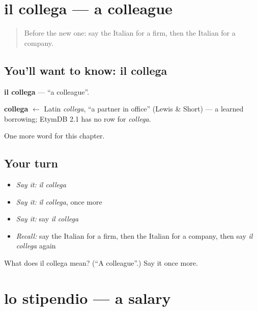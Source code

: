 \section[il collega]{il collega — a colleague}

\label{lesson:IT-C172-collega}



\begin{quote}
Before the new one: say the Italian for a firm, then the Italian for a company.
\end{quote}

\subsection*{You'll want to know: il collega}
\textbf{il collega} — \textquotedblleft{}a colleague\textquotedblright{}.

\begin{cousinweb}
\textbf{collega} $\leftarrow$ Latin \emph{collega}, \textquotedblleft{}a partner in office\textquotedblright{} (Lewis \& Short) — a learned borrowing; EtymDB 2.1 has no row for \emph{collega}.
\end{cousinweb}

\begin{grammarlens}[title={What you've built}]
One more word for this chapter.
\end{grammarlens}

\subsection*{Your turn}
\begin{itemize}
\raggedright
  \item \emph{Say it:} \emph{il collega}
  \item \emph{Say it:} \emph{il collega}, once more
  \item \emph{Say it:} say \emph{il collega}
  \item \emph{Recall:} say the Italian for a firm, then the Italian for a company, then say \emph{il collega} again
\end{itemize}

\begin{tcolorbox}[breakable,colback=teal!4,colframe=teal!35!black,title={Before you move on}]
What does il collega mean? (\textquotedblleft{}A colleague\textquotedblright{}.) Say it once more.
\end{tcolorbox}
\section[lo stipendio]{lo stipendio — a salary}

